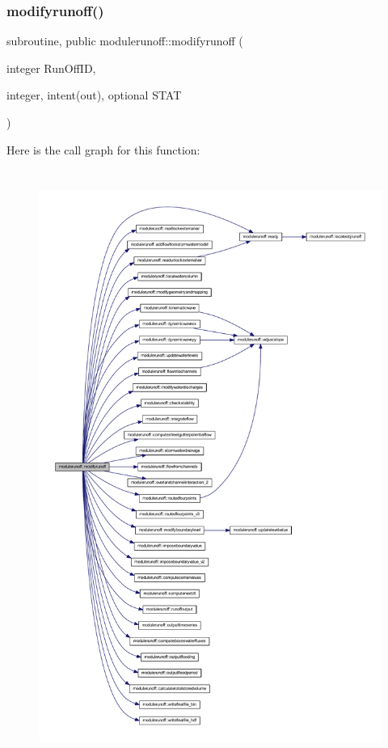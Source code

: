 \subsubsection{\texorpdfstring{modifyrunoff()}{modifyrunoff()}}
{\footnotesize\ttfamily subroutine, public modulerunoff\+::modifyrunoff (\begin{DoxyParamCaption}\item[{integer}]{Run\+Off\+ID,  }\item[{integer, intent(out), optional}]{S\+T\+AT }\end{DoxyParamCaption})}

Here is the call graph for this function\+:
\nopagebreak
\begin{figure}[H]
\begin{center}
\leavevmode
\includegraphics[height=550pt]{namespacemodulerunoff_a43ce9e041625ab643d74cc279ddf43db_cgraph}
\end{center}
\end{figure}
\mbox{\label{namespacemodulerunoff_aadda9f593eae7a9fbebc7ae31f4e847b}} 
